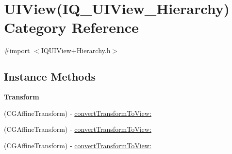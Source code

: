 \hypertarget{category_u_i_view_07_i_q___u_i_view___hierarchy_08}{}\section{U\+I\+View(I\+Q\+\_\+\+U\+I\+View\+\_\+\+Hierarchy) Category Reference}
\label{category_u_i_view_07_i_q___u_i_view___hierarchy_08}


{\ttfamily \#import $<$I\+Q\+U\+I\+View+\+Hierarchy.\+h$>$}

\subsection*{Instance Methods}
\begin{Indent}\textbf{ Transform}\par
{\em 

 

 }\begin{DoxyCompactItemize}
\item 
(C\+G\+Affine\+Transform) -\/ \mbox{\hyperlink{category_u_i_view_07_i_q___u_i_view___hierarchy_08_a5f2253e4faeb705df233def7eaa6605e}{convert\+Transform\+To\+View\+:}}
\item 
(C\+G\+Affine\+Transform) -\/ \mbox{\hyperlink{category_u_i_view_07_i_q___u_i_view___hierarchy_08_a5f2253e4faeb705df233def7eaa6605e}{convert\+Transform\+To\+View\+:}}
\item 
(C\+G\+Affine\+Transform) -\/ \mbox{\hyperlink{category_u_i_view_07_i_q___u_i_view___hierarchy_08_a5f2253e4faeb705df233def7eaa6605e}{convert\+Transform\+To\+View\+:}}
\end{DoxyCompactItemize}
\end{Indent}
